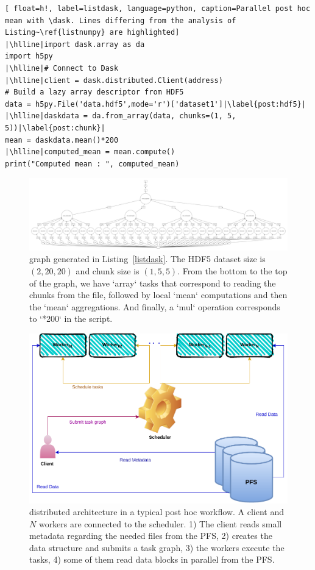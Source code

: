 \begin{lstlisting}[ float=h!, label=listdask, language=python, caption=Parallel post hoc mean with \dask. Lines differing from the analysis of Listing~\ref{listnumpy} are highlighted]
|\hlline|import dask.array as da
import h5py
|\hlline|# Connect to Dask
|\hlline|client = dask.distributed.Client(address)
# Build a lazy array descriptor from HDF5
data = h5py.File('data.hdf5',mode='r')['dataset1']|\label{post:hdf5}|
|\hlline|daskdata = da.from_array(data, chunks=(1, 5, 5))|\label{post:chunk}|
mean = daskdata.mean()*200
|\hlline|computed_mean = mean.compute()
print("Computed mean : ", computed_mean)
\end{lstlisting}

\begin{figure}[ht!]\centering
\includegraphics[scale=0.145, angle=90]{figures/mean.pdf}
\caption{\dask graph generated in Listing~\ref{listdask}. The HDF5 dataset size is $(2, 20, 20)$ and chunk size is $(1, 5, 5)$. From the bottom to the top of the graph, we have `array` tasks that correspond to reading the chunks from the file, followed by local `mean` computations and then the `mean` aggregations. And finally, a `mul` operation corresponds to `*200` in the script.}
\label{figtaskmean}
\end{figure}

\begin{figure}[tb]\centering
\includegraphics[scale=0.6]{figures/DaskArchiecture.pdf}
\caption{\dask distributed architecture in a typical post hoc workflow. A client and $N$ workers are connected to the scheduler. 1) The client reads small metadata regarding the needed files from the PFS, 2) creates the \dask data structure and submits a task graph, 3) the workers execute the tasks, 4) some of them read data blocks in parallel from the PFS.}
\label{figdaskarchi}
\end{figure}

